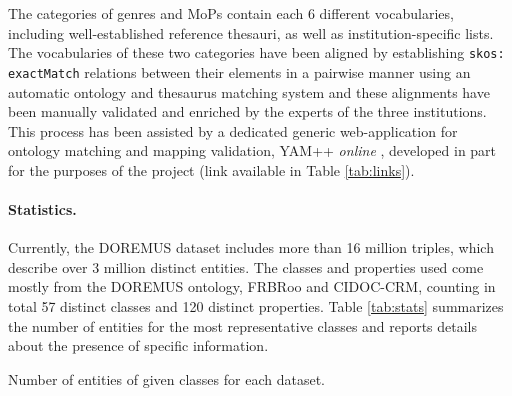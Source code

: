 The categories of genres and MoPs contain each 6 different vocabularies, including well-established reference thesauri, as well as institution-specific lists. The vocabularies of these two categories have been aligned by establishing {\tt skos:\\exactMatch} relations between their elements in a pairwise manner using an automatic ontology and thesaurus matching system and these alignments have been manually validated and enriched by the experts of the three institutions. This process has been assisted by a dedicated generic web-application for ontology matching and mapping validation, YAM++ {\it online} \cite{bellahsene2017yam++}, developed in part for the purposes of the project (link available in Table \ref{tab:links}).


\paragraph{Statistics.}
Currently, the DOREMUS dataset includes more than 16 million triples, which describe over 3 million distinct entities. The classes and properties used come mostly from the DOREMUS ontology, FRBRoo and CIDOC-CRM, counting in total 57 distinct classes and 120 distinct properties. Table \ref{tab:stats} summarizes the number of entities for the most representative classes and reports  details about the presence of specific information. 

\begin{table}[htbp]
	\centering
	\caption{Number of entities of given classes for each dataset.}
    \label{tab:stats}
\end{table}

\nopagebreak


